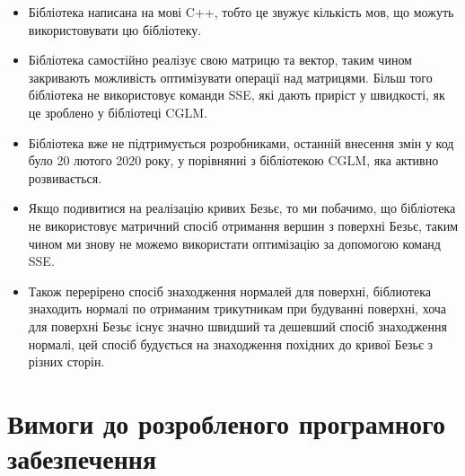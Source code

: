 \documentclass[14pt,a4paper]{extarticle}
\theoremstyle{definition}
\renewcommand{\[}{\begin{singlespace}\begin{equation*}}
\renewcommand{\]}{\end{equation*}\end{singlespace}}
\begin{document}
\begin{itemize}
\item Бібліотека написана на мові C++, тобто це звужує кількість мов, що можуть використовувати цю бібліотеку.
\item Бібліотека самостійно реалізує свою матрицю та вектор, таким чином закривають можливість оптимізувати операції над матрицями. Більш того бібліотека не  використовує команди SSE, які дають приріст у швидкості, як це зроблено у бібліотеці CGLM.
\item Бібліотека вже не підтримується розробниками, останній внесення змін у код було 20 лютого 2020 року, у порівнянні з бібліотекою CGLM, яка активно розвивається.
\item Якщо подивитися на реалізацію кривих Безьє, то ми побачимо, що бібліотека не використовує матричний спосіб отримання вершин з поверхні Безьє, таким чином ми знову не можемо використати оптимізацію за допомогою команд SSE.
\item Також перерірено спосіб знаходження нормалей для поверхні, біблиотека знаходить нормалі по отриманим трикутникам при будуванні поверхні, хоча для поверхні Безьє існує значно швидший та дешевший спосіб знаходження нормалі, цей спосіб будується на знаходження похідних до кривої Безьє з різних сторін.
\end{itemize}

\section{Вимоги до розробленого програмного забезпечення}
\end{document}
